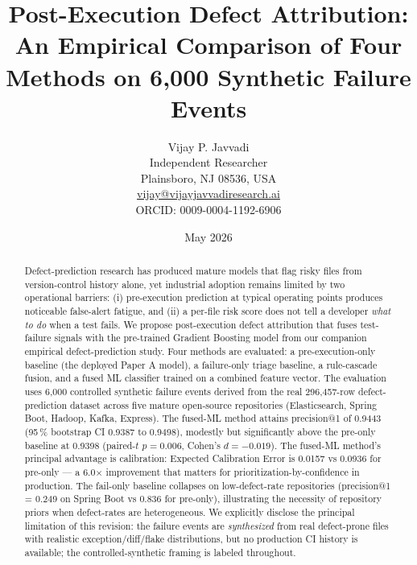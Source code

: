 \documentclass[11pt,a4paper]{article}
\begin{document}
\title{Post-Execution Defect Attribution: An Empirical Comparison of Four Methods on 6,000 Synthetic Failure Events}

\author{Vijay P. Javvadi \\
Independent Researcher \\
              Plainsboro, NJ 08536, USA \\
              \href{mailto:vijay@vijayjavvadiresearch.ai}{vijay@vijayjavvadiresearch.ai} \\
              ORCID: 0009-0004-1192-6906}

\date{May 2026}

\maketitle

\begin{abstract}
\noindent Defect-prediction research has produced mature models that flag
risky files from version-control history alone, yet industrial adoption
remains limited by two operational barriers: (i) pre-execution prediction
at typical operating points produces noticeable false-alert fatigue, and
(ii) a per-file risk score does not tell a developer \emph{what to do}
when a test fails. We propose post-execution defect attribution
that fuses test-failure signals with the pre-trained Gradient Boosting
model from our companion empirical defect-prediction study. Four methods
are evaluated: a pre-execution-only baseline (the deployed Paper A
model), a failure-only triage baseline, a rule-cascade fusion, and a
fused ML classifier trained on a combined feature vector. The evaluation
uses 6{,}000 controlled synthetic failure events derived from the real
296{,}457-row defect-prediction dataset across five mature open-source
repositories (Elasticsearch, Spring Boot, Hadoop, Kafka, Express).
The fused-ML method attains precision@1 of 0.9443 (95\,\% bootstrap CI
0.9387 to 0.9498), modestly but significantly above the pre-only
baseline at 0.9398 (paired-$t$ $p=0.006$, Cohen's $d=-0.019$). The
fused-ML method's principal advantage is calibration: Expected
Calibration Error is 0.0157 vs 0.0936 for pre-only --- a 6.0$\times$
improvement that matters for prioritization-by-confidence in
production. The fail-only baseline collapses on low-defect-rate
repositories (precision@1 = 0.249 on Spring Boot vs 0.836 for
pre-only), illustrating the necessity of repository priors when
defect-rates are heterogeneous. We explicitly disclose the principal
limitation of this revision: the failure events are
\emph{synthesized} from real defect-prone files with realistic
exception/diff/flake distributions, but no production CI history is
available; the controlled-synthetic framing is labeled throughout.
\end{abstract}
\end{document}

